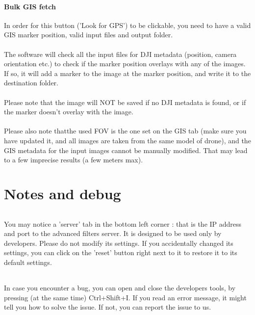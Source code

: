 \documentclass[12pt,a4paper]{article}
\begin{document}
\subsection{Bulk GIS fetch}
In order for this button ('Look for GPS') to be clickable, you need to have a valid GIS marker position, valid input files and output folder.\\
~\\
The software will check all the input files for DJI metadata (position, camera orientation etc.) to check if the marker position overlays with any of the images. If so, it will add a marker to the image at the marker position, and write it to the destination folder.\\
~\\
Please note that the image will NOT be saved if no DJI metadata is found, or if the marker doesn't overlay with the image.\\
~\\
Please also note thatthe used FOV is the one set on the GIS tab (make sure you have updated it, and all images are taken from the same model of drone), and the GIS metadata for the input images cannot be manually modified. That may lead to a few imprecise results (a few meters max).

\pagebreak

\part{Notes and debug}
\setcounter{section}{0}

\paragraph{} You may notice a 'server' tab in the bottom left corner : that is the IP address and port to the advanced filters server. It is designed to be used only by developers. Please do not modify its settings. If you accidentally changed its settings, you can click on the 'reset' button right next to it to restore it to its default settings.\\

\paragraph{} In case you encounter a bug, you can open and close the developers tools, by pressing (at the same time) Ctrl+Shift+I. If you read an error message, it might tell you how to solve the issue. If not, you can report the issue to us.
\end{document}
